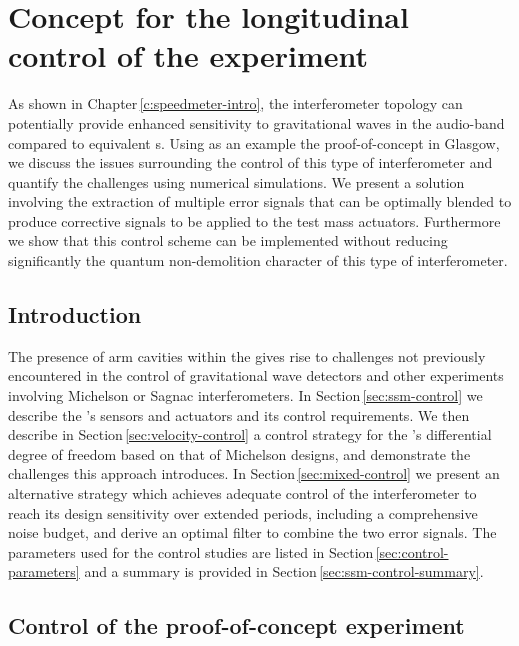 \chapter{\label{c:speedmeter-control}Concept for the longitudinal control of the \SSM{} experiment}

\newcommand{\RT}{$\textrm{R}_{\textrm{T}}$}

As shown in Chapter\,\ref{c:speedmeter-intro}, the \SSM{} interferometer topology can potentially provide enhanced sensitivity to gravitational waves in the audio-band compared to equivalent \MI{}s. Using as an example the proof-of-concept \SSMEXPT{} in Glasgow, we discuss the issues surrounding the control of this type of interferometer and quantify the challenges using numerical simulations. We present a solution involving the extraction of multiple error signals that can be optimally blended to produce corrective signals to be applied to the test mass actuators. Furthermore we show that this control scheme can be implemented without reducing significantly the quantum non-demolition character of this type of interferometer.

\section{Introduction}
The presence of arm cavities within the \SSMEXPT{} gives rise to challenges not previously encountered in the control of gravitational wave detectors and other experiments involving Michelson or Sagnac interferometers. In Section\,\ref{sec:ssm-control} we describe the \SSMEXPT{}'s sensors and actuators and its control requirements. We then describe in Section\,\ref{sec:velocity-control} a control strategy for the \SSM{}'s differential degree of freedom based on that of Michelson designs, and demonstrate the challenges this approach introduces. In Section\,\ref{sec:mixed-control} we present an alternative strategy which achieves adequate control of the interferometer to reach its design sensitivity over extended periods, including a comprehensive noise budget, and derive an optimal filter to combine the two error signals. The parameters used for the control studies are listed in Section\,\ref{sec:control-parameters} and a summary is provided in Section\,\ref{sec:ssm-control-summary}.

\section{\label{sec:ssm-control}Control of the proof-of-concept experiment}

